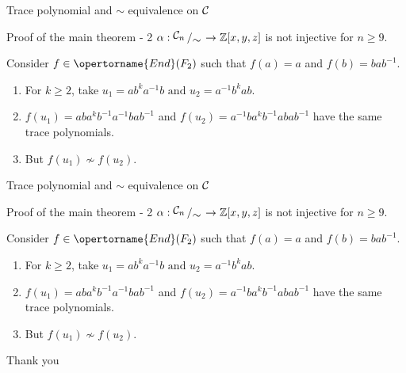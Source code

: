 \documentclass[aspectratio={169}]{beamer}
\begin{document}
\begin{frame}{Trace polynomial and $\sim$ equivalence on $\mathcal{C}$}
\begin{block}{Proof of the main theorem - 2}
$\TR : \bigslant{\cwn}{\sim} \rightarrow  \mathbb{Z}[x,y,z] $
is not injective for $n \geq 9.$
\end{block}
        Consider $f\in\opertorname{End}(F_2)$ such that $f(a)=a$ and $f(b)=bab^{-1}$. 
    \begin{enumerate}
        \vskip 0.5cm
        \item For $k\geq2$, take $u_1 = ab^ka^{-1}b  \text{ and } u_2 = a^{-1}b^kab$.
        \vskip 0.5cm
        \item $f(u_1)=aba^kb^{-1}a^{-1}bab^{-1}$ and $f(u_2)= a^{-1}ba^{k}b^{-1}abab^{-1} $
        have the same trace polynomials. 
        \vskip 0.5cm
        \item But $f(u_1) \not\sim f(u_2)$.
        \vskip 0.5cm
    \end{enumerate}
\end{frame}
\begin{frame}{Trace polynomial and $\sim$ equivalence on $\mathcal{C}$}
\begin{block}{Proof of the main theorem - 2}
$\TR : \bigslant{\cwn}{\sim} \rightarrow  \mathbb{Z}[x,y,z] $
is not injective for $n \geq 9.$
\end{block}
        Consider $f\in\opertorname{End}(F_2)$ such that $f(a)=a$ and $f(b)=bab^{-1}$. 
    \begin{enumerate}
        \vskip 0.5cm
        \item For $k\geq2$, take $u_1 = ab^ka^{-1}b  \text{ and } u_2 = a^{-1}b^kab$.
        \vskip 0.5cm
        \item $f(u_1)=aba^kb^{-1}a^{-1}bab^{-1}$ and $f(u_2)= a^{-1}ba^{k}b^{-1}abab^{-1} $
        have the same trace polynomials. 
        \vskip 0.5cm
        \item But $f(u_1) \not\sim f(u_2)$.
        \vskip 0.5cm
    \end{enumerate}
\end{frame}
\begin{frame}
\begin{center}
\huge{Thank you}
\end{center}
\end{frame}
\end{document}
